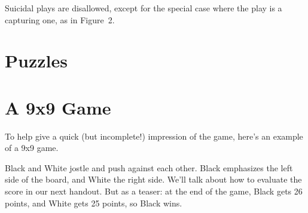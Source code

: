 \documentclass{article}
\begin{document}
\begin{center}
%
\end{center}
Suicidal plays are disallowed, except for the special case where the
play is a capturing one, as in Figure~2.



\section*{Puzzles}
\begin{center}
\cleargoban
{}
\hspace{1in}%
\hspace{1in}%
\end{center}




\section*{A 9x9 Game}
To help give a quick (but incomplete!) impression of the game, here's
an example of a 9x9 game.
%
\begin{center}
\hspace{1in}%
\hspace{1in}%
\end{center}
%
Black and White jostle and push against each other.  Black emphasizes
the left side of the board, and White the right side.  We'll talk
about how to evaluate the score in our next handout.  But as a teaser:
at the end of the game, Black gets 26 points, and White gets 25
points, so Black wins.
\end{document}
